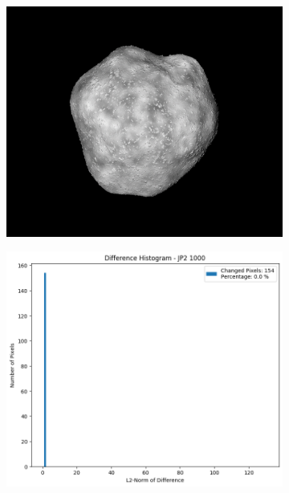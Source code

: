 \begin{figure}[htb]
    \centering
    \begin{subfigure}[b]{0.48\textwidth}
        \centering
        \includegraphics[width=\textwidth]{doc/thesis/0_figures/compare_quality/set1/jp2_1000.png}
        \caption{}
        \label{fig:img_quality_comp_jp2_1000_orig}
    \end{subfigure}
    \begin{subfigure}[b]{0.48\textwidth}
        \centering
        \includegraphics[width=\textwidth]{doc/thesis/0_figures/compare_quality/set1/jp2_1000_diff_histogram.png}

\end{subfigure}
\end{figure}
